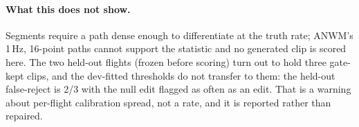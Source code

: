 \paragraph{What this does not show.} Segments require a path dense enough to differentiate at
the truth rate; ANWM's 1\,Hz, 16-point paths cannot support the statistic and no generated clip
is scored here. The two held-out flights (frozen before scoring) turn out to hold three
gate-kept clips, and the dev-fitted thresholds do not transfer to them: the held-out false-reject
is 2/3 with the null edit flagged as often as an edit. That is a warning about per-flight
calibration spread, not a rate, and it is reported rather than repaired.
